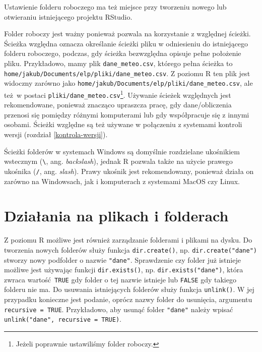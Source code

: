 \documentclass[paper=6in:9in,pagesize=pdftex,headinclude=on,footinclude=on,10pt]{scrbook}
\let\BeginKnitrBlock\begin \let\EndKnitrBlock\end
\begin{document}
\BeginKnitrBlock{rmdinfo}
Ustawienie folderu roboczego ma też miejsce przy tworzeniu nowego lub otwieraniu istniejącego projektu RStudio.
\EndKnitrBlock{rmdinfo}

Folder roboczy jest ważny ponieważ pozwala na korzystanie z względnej ścieżki.
Ścieżka względna oznacza określanie ścieżki pliku w odniesieniu do istniejącego folderu roboczego, podczas, gdy ścieżka bezwzględna opisuje pełne położenie pliku.
Przykładowo, mamy plik \texttt{dane\_meteo.csv}, którego pełna ścieżka to \texttt{home/jakub/Documents/elp/pliki/dane\_meteo.csv}.
Z poziomu R ten plik jest widoczny zarówno jako \texttt{home/jakub/Documents/elp/pliki/dane\_meteo.csv}, ale też~w postaci \texttt{pliki/dane\_meteo.csv}\footnote{Jeżeli poprawnie ustawiliśmy folder roboczy.}.
Używanie ścieżek względnych jest rekomendowane, ponieważ znacząco upraszcza pracę, gdy dane/obliczenia przenosi się pomiędzy różnymi komputerami lub gdy współpracuje się z innymi osobami.
Ścieżki względne są też używane w połączeniu z systemami kontroli wersji (rozdział \ref{kontrola-wersji}).

\BeginKnitrBlock{rmdinfo}
Ścieżki folderów w systemach Windows są domyślnie rozdzielane ukośnikiem wstecznym (\texttt{\textbackslash{}}, ang. \emph{backslash}), jednak R pozwala także na użycie prawego ukośnika (\texttt{/}, ang. \emph{slash}).
Prawy ukośnik jest rekomendowany, ponieważ działa on zarówno na Windowsach, jak i komputerach z systemami MacOS czy Linux.
\EndKnitrBlock{rmdinfo}

\hypertarget{dziaania-na-plikach-i-folderach}{%
\section{Działania na plikach i folderach}\label{dziaania-na-plikach-i-folderach}}

Z poziomu R możliwe jest również zarządzanie folderami i plikami na dysku.
Do tworzenia nowych folderów służy funkcja \texttt{dir.create()}, np. \texttt{dir.create("dane")} stworzy nowy podfolder o nazwie \texttt{"dane"}.
Sprawdzenie czy folder już istnieje możliwe jest używając funkcji \texttt{dir.exists()}, np. \texttt{dir.exists("dane")}, która zwraca wartość~\texttt{TRUE} gdy folder o tej nazwie istnieje lub \texttt{FALSE} gdy takiego folderu nie ma.
Do usuwania istniejących folderów służy funkcja \texttt{unlink()}.
W jej przypadku konieczne jest podanie, oprócz nazwy folder do usunięcia, argumentu \texttt{recursive\ =\ TRUE}.
Przykładowo, aby usunąć folder \texttt{"dane"} należy wpisać \texttt{unlink("dane",\ recursive\ =\ TRUE)}.
\end{document}
